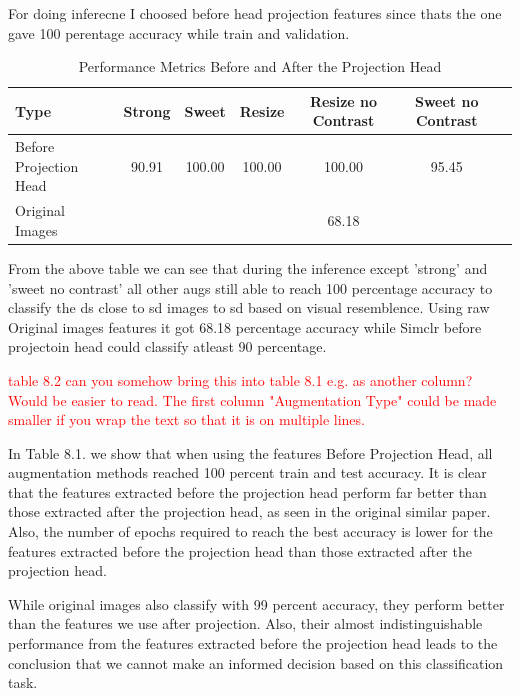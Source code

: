 For doing inferecne I choosed before head projection features since thats the one gave 100 perentage accuracy while train and validation.


\begin{table}[H]
    \centering
    \begin{tabular}{@{}lcccccc@{}}
    \toprule
    \textbf{Type} & \textbf{Strong} & \textbf{Sweet} & \textbf{Resize} & \textbf{Resize no Contrast} & \textbf{Sweet no Contrast} \\ \midrule
    Before Projection Head & 90.91 & 100.00 & 100.00 & 100.00 & 95.45 \\ \midrule
    Original Images & & & & 68.18 & \\ \bottomrule
    \end{tabular}
    \caption{Performance Metrics Before and After the Projection Head}
    \label{tab:performance_metrics}
\end{table}



From the above table we can see that during the inference except 'strong' and 'sweet no contrast' all other augs still able to reach 100 percentage accuracy to classify the ds 
close to sd images to sd based on visual resemblence. Using raw Original images features it got  68.18 percentage accuracy while Simclr before projectoin head could classify atleast 90 percentage.


\textcolor{red}{table 8.2 can you somehow bring this into table 8.1 e.g. as another column? Would be easier to read. The first column 
"Augmentation Type" could be made smaller if you wrap the text so that it is on multiple lines.} 


In Table 8.1. we show that when using the features Before Projection Head, all augmentation methods reached 100 percent train and test accuracy. It is clear that the features extracted 
before the projection head perform far better than those extracted after the projection head, as seen in the original similar paper. Also, the number of epochs required
to reach the best accuracy is lower for the features extracted before the projection head than those extracted after the projection head.

While original images also classify with 99 percent accuracy, they perform better than the features we use after projection. Also, their almost indistinguishable performance 
from the features extracted before the projection head leads to the conclusion that we cannot make an informed decision based on this classification task.



